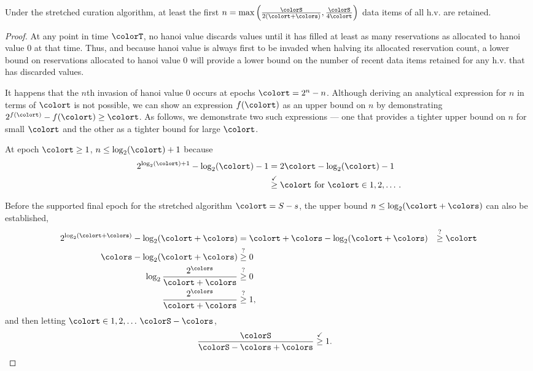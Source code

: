 \begin{theorem}
\label{thm:stretched-reservation-count}
Under the stretched curation algorithm, at least the first $n=\max\Big(
  \frac{\colorS}{2(\colort + \colors)},
  \frac{\colorS}{4\colort}
\Big)$ data items of all h.v. are retained.
\end{theorem}
\begin{proof}

At any point in time $\colorT$, no hanoi value discards values until it has filled at least as many reservations as allocated to hanoi value 0 at that time.
Thus, and because hanoi value is always first to be invaded when halving its allocated reservation count, a lower bound on reservations allocated to hanoi value 0 will provide a lower bound on the number of recent data items retained for any h.v. that has discarded values.

It happens that the $n$th invasion of hanoi value 0 occurs at epochs $\colort = 2^n - n$.
Although deriving an analytical expression for $n$ in terms of $\colort$ is not possible, we can show an expression $f(\colort)$ as an upper bound on $n$ by demonstrating $2^{f(\colort)} - f(\colort) \geq \colort$.
As follows, we demonstrate two such expressions --- one that provides a tighter upper bound on $n$ for small $\colort$ and the other as a tighter bound for large $\colort$.

At epoch $\colort \geq 1$, $n \leq \log_2(\colort) + 1$ because
\begin{align*}
2^{\log_{2}(\colort) + 1} - \log_2(\colort) - 1
&= 2\colort - \log_2(\colort) - 1\\
&\stackrel{\checkmark}{\geq} \colort \text{ for } \colort \in 1, 2, \ldots \, .
\end{align*}

Before the supported final epoch for the stretched algorithm $\colort = S - s$, the upper bound $n \leq \log_2(\colort + \colors)$ can also be established,
\begin{align*}
2^{\log_{2}(\colort + \colors)} - \log_2(\colort + \colors)
&=
\colort + \colors - \log_2(\colort + \colors)
&\stackrel{?}{\geq} \colort\\
\colors - \log_2(\colort + \colors)
&\stackrel{?}{\geq} 0\\
\log_2\frac{2^{\colors}}{\colort + \colors}
&\stackrel{?}{\geq} 0\\
\frac{2^{\colors}}{\colort + \colors}
&\stackrel{?}{\geq} 1,
\end{align*}
and then letting $\colort \in 1, 2, \ldots \, \colorS - \colors$,
\begin{align*}
\frac{\colorS}{\colorS - \colors + \colors}
&\stackrel{\checkmark}{\geq} 1.
\end{align*}


\end{proof}
